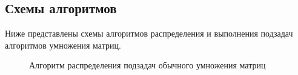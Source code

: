 \documentclass[a4paper,12pt]{article}
\begin{document}
\subsection{Схемы алгоритмов}
Ниже представлены схемы алгоритмов распределения и выполнения подзадач алгоритмов умножения матриц.
\begin{figure}[h]
\caption{Алгоритм распределения подзадач обычного умножения матриц}
\label{schemes:scheme1}
\end{figure}
\end{document}
